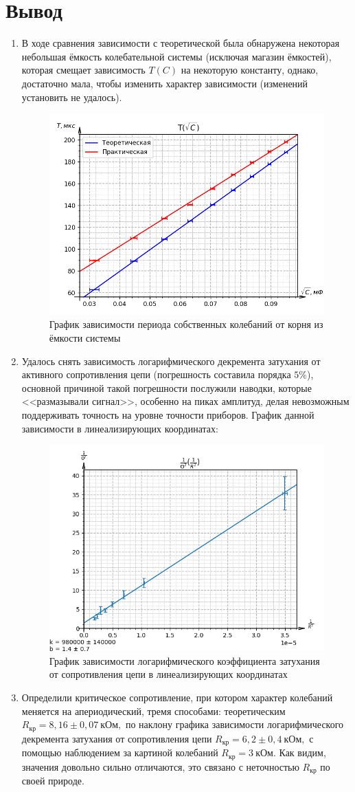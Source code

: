 \documentclass[a4paper,12pt]{extarticle}
\begin{document}
\section{Вывод}
\begin{enumerate}
    \item В ходе сравнения зависимости с теоретической была обнаружена некоторая небольшая ёмкость колебательной системы (исключая магазин ёмкостей), которая смещает зависимость $T(C)$ на некоторую константу, однако, достаточно мала, чтобы изменить характер зависимости (изменений установить не удалось).
    \begin{figure}[h!]
    \centering
    \includegraphics[width=0.6\linewidth]{T(C).png}
    \caption{График зависимости периода собственных колебаний от корня из ёмкости системы}
    \end{figure}
    \item Удалось снять зависимость логарифмического декремента затухания от активного сопротивления цепи (погрешность составила порядка $5\%$), основной причиной такой погрешности послужили наводки, которые <<размазывали сигнал>>, особенно на пиках амплитуд, делая невозможным поддерживать точность на уровне точности приборов. График данной зависимости в линеализирующих координатах:
    \begin{figure}[h!]
    \centering
    \includegraphics[width=0.6\linewidth]{th(r).png}
    \caption{График зависимости логарифмического коэффициента затухания от сопротивления цепи в линеализирующих координатах}
    \end{figure}
    \newpage
    \item Определили критическое сопротивление, при котором характер колебаний меняется на апериодический, тремя способами: теоретическим $R_\text{кр} = 8,16 \pm 0,07 \ \text{кОм},$ по наклону графика зависимости логарифмического декремента затухания от сопротивления цепи $R_\text{кр} = 6,2 \pm 0,4 \ \text{кОм},$ с помощью наблюдением за картиной колебаний $R_\text{кр} = 3 \ \text{кОм}.$ Как видим, значения довольно сильно отличаются, это связано с неточностью $R_\text{кр}$ по своей природе.


\end{enumerate}
\end{document}
